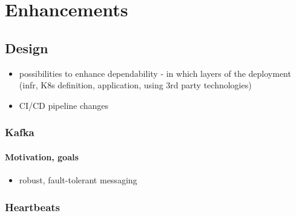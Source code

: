 \chapter{Enhancements} \label{enhancements}

\section{Design}

\begin{itemize}
	\item possibilities to enhance dependability - in which layers of the deployment (infr, K8s definition, application, using 3rd party technologies)
	\item CI/CD pipeline changes
\end{itemize}

\subsection{Kafka}

\subsubsection{Motivation, goals}

\begin{itemize}
	\item robust, fault-tolerant messaging
\end{itemize}

\subsection{Heartbeats}

